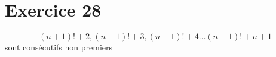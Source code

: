 \part{Exercice 28}

\[
	(n+1)!+2,(n+1)!+3,(n+1)!+4\ldots(n+1)! + n+1
\] sont consécutifs non premiers
